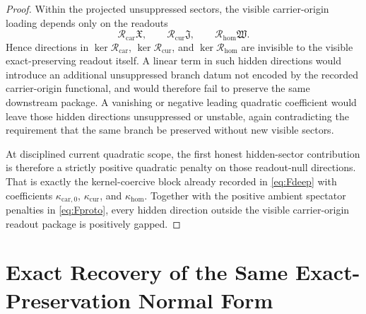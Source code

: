 \documentclass[11pt]{article}
\newcommand{\PreCarGap}{\kappa_{\mathrm{car},0}}
\newcommand{\CurrentGap}{\kappa_{\mathrm{cur}}}
\newcommand{\HomGap}{\kappa_{\mathrm{hom}}}
\newcommand{\DeepTensor}{\mathfrak X}
\newcommand{\DeepRelabel}{\mathfrak J}
\newcommand{\DeepFree}{\mathfrak W}
\newcommand{\CarRead}{\mathcal R_{\mathrm{car}}}
\newcommand{\CurRead}{\mathcal R_{\mathrm{cur}}}
\newcommand{\HomRead}{\mathcal R_{\mathrm{hom}}}
\begin{document}
\begin{proof}
Within the projected unsuppressed sectors, the visible carrier-origin loading depends only on the readouts
\[
\CarRead\DeepTensor,\qquad
\CurRead\DeepRelabel,\qquad
\HomRead\DeepFree.
\]
Hence directions in \(\ker\CarRead\), \(\ker\CurRead\), and \(\ker\HomRead\) are invisible to the visible exact-preserving readout itself. A linear term in such hidden directions would introduce an additional unsuppressed branch datum not encoded by the recorded carrier-origin functional, and would therefore fail to preserve the same downstream package. A vanishing or negative leading quadratic coefficient would leave those hidden directions unsuppressed or unstable, again contradicting the requirement that the same branch be preserved without new visible sectors.

At disciplined current quadratic scope, the first honest hidden-sector contribution is therefore a strictly positive quadratic penalty on those readout-null directions. That is exactly the kernel-coercive block already recorded in \eqref{eq:Fdeep} with coefficients \(\PreCarGap\), \(\CurrentGap\), and \(\HomGap\). Together with the positive ambient spectator penalties in \eqref{eq:Fproto}, every hidden direction outside the visible carrier-origin readout package is positively gapped.
\end{proof}

\section{Exact Recovery of the Same Exact-Preservation Normal Form}
\end{document}
